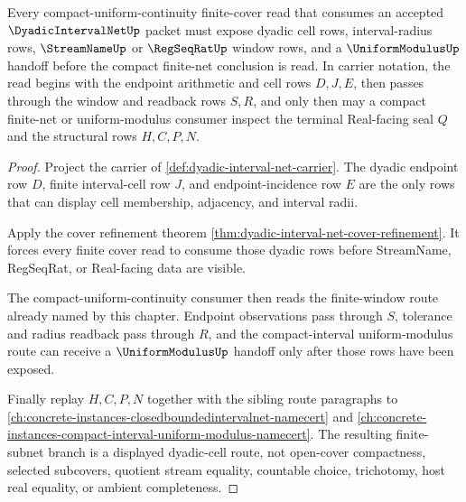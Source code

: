 \begin{theorem}\label{thm:dyadic-interval-net-uniform-subnet}
Every compact-uniform-continuity finite-cover read that consumes an accepted $\DyadicIntervalNetUp$ packet must expose dyadic cell rows, interval-radius rows, $\StreamNameUp$ or $\RegSeqRatUp$ window rows, and a $\UniformModulusUp$ handoff before the compact finite-net conclusion is read. In carrier notation, the read begins with the endpoint arithmetic and cell rows $D,J,E$, then passes through the window and readback rows $S,R$, and only then may a compact finite-net or uniform-modulus consumer inspect the terminal Real-facing seal $Q$ and the structural rows $H,C,P,N$.
\end{theorem}
\begin{proof}
Project the carrier of \autoref{def:dyadic-interval-net-carrier}. The dyadic endpoint row $D$, finite interval-cell row $J$, and endpoint-incidence row $E$ are the only rows that can display cell membership, adjacency, and interval radii.

Apply the cover refinement theorem \autoref{thm:dyadic-interval-net-cover-refinement}. It forces every finite cover read to consume those dyadic rows before StreamName, RegSeqRat, or Real-facing data are visible.

The compact-uniform-continuity consumer then reads the finite-window route already named by this chapter. Endpoint observations pass through $S$, tolerance and radius readback pass through $R$, and the compact-interval uniform-modulus route can receive a $\UniformModulusUp$ handoff only after those rows have been exposed.

Finally replay $H,C,P,N$ together with the sibling route paragraphs to \autoref{ch:concrete-instances-closedboundedintervalnet-namecert} and \autoref{ch:concrete-instances-compact-interval-uniform-modulus-namecert}. The resulting finite-subnet branch is a displayed dyadic-cell route, not open-cover compactness, selected subcovers, quotient stream equality, countable choice, trichotomy, host real equality, or ambient completeness.
\end{proof}

